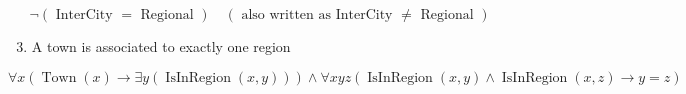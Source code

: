 \documentclass[10pt]{article}
\begin{document}
\begin{equation*}
\neg(\text { InterCity }=\text { Regional }) \quad(\text { also written as InterCity } \neq \text { Regional }) \tag{3.2}
\end{equation*}


\begin{enumerate}
  \setcounter{enumi}{2}
  \item A town is associated to exactly one region
\end{enumerate}


\begin{equation*}
\forall x(\operatorname{Town}(x) \rightarrow \exists y(\operatorname{IsInRegion}(x, y))) \wedge \forall x y z(\operatorname{IsInRegion}(x, y) \wedge \operatorname{IsInRegion}(x, z) \rightarrow y=z) \tag{3.3}
\end{equation*}
\end{document}
